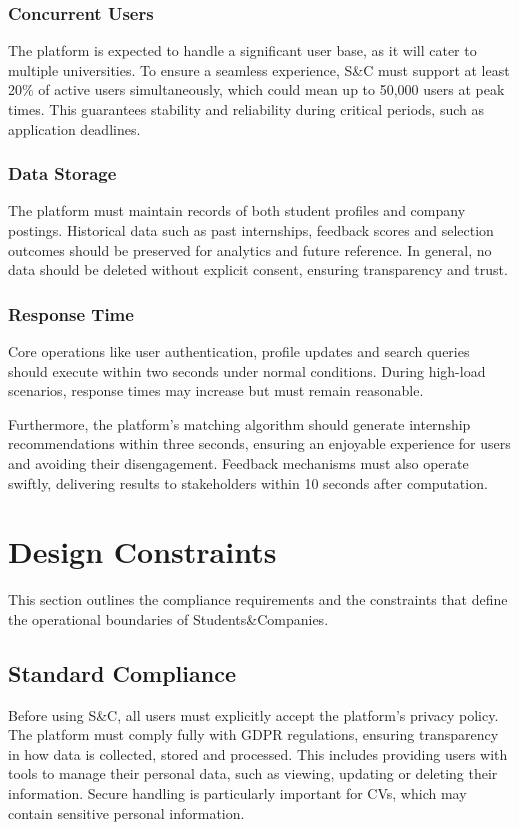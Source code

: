 \subsubsection{Concurrent Users}
The platform is expected to handle a significant user base, as it will cater to multiple universities.
To ensure a seamless experience, S\&C must support at least 20\% of active users simultaneously, which could mean up to 50,000 users at peak times.
This guarantees stability and reliability during critical periods, such as application deadlines.

\subsubsection{Data Storage}
The platform must maintain records of both student profiles and company postings.
Historical data such as past internships, feedback scores and selection outcomes should be preserved for analytics and future reference.
In general, no data should be deleted without explicit consent, ensuring transparency and trust.

\subsubsection{Response Time}
Core operations like user authentication, profile updates and search queries should execute within two seconds under normal conditions.
During high-load scenarios, response times may increase but must remain reasonable.

Furthermore, the platform's matching algorithm should generate internship recommendations within three seconds, ensuring an enjoyable experience for users and avoiding their disengagement.
Feedback mechanisms must also operate swiftly, delivering results to stakeholders within 10 seconds after computation.

\section{Design Constraints}
This section outlines the compliance requirements and the constraints that define the operational boundaries of Students\&Companies.

\subsection{Standard Compliance}
Before using S\&C, all users must explicitly accept the platform's privacy policy.
The platform must comply fully with GDPR regulations, ensuring transparency in how data is collected, stored and processed.
This includes providing users with tools to manage their personal data, such as viewing, updating or deleting their information.
Secure handling is particularly important for CVs, which may contain sensitive personal information.

